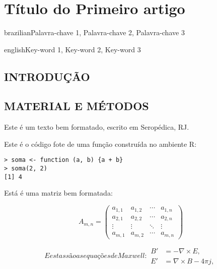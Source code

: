 \artigotrue
\chapter{Título do Primeiro artigo}
\label{chap:chapter01}

\begin{chapterabstract}{brazilian}{Palavra-chave 1, Palavra-chave 2, Palavra-chave 3}
\end{chapterabstract}

\begin{chapterabstract}{english}{Key-word 1, Key-word 2, Key-word 3}
\end{chapterabstract}

\formatchapter

\section{INTRODUÇÃO}

\blindtext[2]

\section{MATERIAL E MÉTODOS}

Este é um texto bem formatado, escrito em Seropédica, RJ. \blindtext[1]

Este é o código fote de uma função construída no ambiente R:

\begin{verbatim}
> soma <- function (a, b) {a + b}
> soma(2, 2)
[1] 4
\end{verbatim}

Está é uma matriz bem formatada:

\begin{equation}
  A_{m,n} =
 \begin{pmatrix}
  a_{1,1} & a_{1,2} & \cdots & a_{1,n} \\
  a_{2,1} & a_{2,2} & \cdots & a_{2,n} \\
  \vdots  & \vdots  & \ddots & \vdots  \\
  a_{m,1} & a_{m,2} & \cdots & a_{m,n}
 \end{pmatrix}
\end{equation}

\begin{subequations}\label{eq:maxwell}
E estas são as equações de Maxwell:
\begin{align}
        B'&=-\nabla \times E,\\
        E'&=\nabla \times B - 4\pi j,
\end{align}
\end{subequations}

